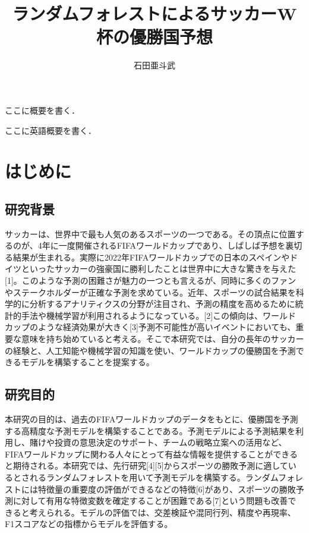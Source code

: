 \documentclass[platex]{suribt}
\title{ランダムフォレストによるサッカーW杯の優勝国予想}
\author{石田亜斗武}
\begin{document}
\maketitle%


\frontmatter%
\begin{jabstract}%
 ここに概要を書く．
\end{jabstract}

\newpage

\begin{eabstract}%
 ここに英語概要を書く．
\end{eabstract}


\tableofcontents%

\mainmatter%
\chapter{はじめに}
\section{研究背景}
サッカーは、世界中で最も人気のあるスポーツの一つである。その頂点に位置するのが、4年に一度開催されるFIFAワールドカップであり、しばしば予想を裏切る結果が生まれる。実際に2022年FIFAワールドカップでの日本のスペインやドイツといったサッカーの強豪国に勝利したことは世界中に大きな驚きを与えた[1]。このような予測の困難さが魅力の一つとも言えるが、同時に多くのファンやステークホルダーが正確な予測を求めている。近年、スポーツの試合結果を科学的に分析するアナリティクスの分野が注目され、予測の精度を高めるために統計的手法や機械学習が利用されるようになっている。[2]この傾向は、ワールドカップのような経済効果が大きく[3]予測不可能性が高いイベントにおいても、重要な意味を持ち始めていると考える。そこで本研究では、自分の長年のサッカーの経験と、人工知能や機械学習の知識を使い、ワールドカップの優勝国を予測できるモデルを構築することを提案する。
\section{研究目的}
本研究の目的は、過去のFIFAワールドカップのデータをもとに、優勝国を予測する高精度な予測モデルを構築することである。予測モデルによる予測結果を利用し、賭けや投資の意思決定のサポート、チームの戦略立案への活用など、FIFAワールドカップに関わる人々にとって有益な情報を提供することができると期待される。本研究では、先行研究[4][5]からスポーツの勝敗予測に適しているとされるランダムフォレストを用いて予測モデルを構築する。ランダムフォレストには特徴量の重要度の評価ができるなどの特徴[6]があり、スポーツの勝敗予測に対して有用な特徴変数を確定することが困難である[7]という問題も改善できると考えられる。モデルの評価では、交差検証や混同行列、精度や再現率、F1スコアなどの指標からモデルを評価する。
\end{document}
